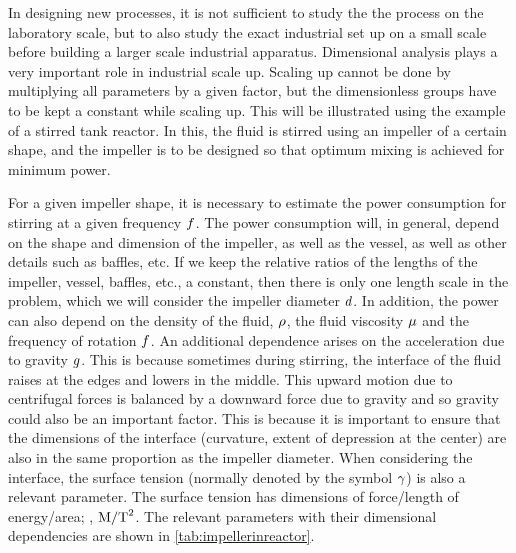 \begin{example}
In designing new processes, it is not sufficient to study the the process on the laboratory scale, but to also study the exact industrial set up on a small scale before building a larger scale industrial apparatus. Dimensional analysis plays a very important role in industrial scale up. Scaling up cannot be done by multiplying all parameters by a given factor, but the dimensionless groups have to be kept a constant while scaling up. This will be illustrated using the example of a stirred tank reactor. In this, the fluid is stirred using an impeller of a certain shape, and the impeller is to be designed so that optimum mixing is achieved for minimum power.
\end{example}

\begin{solution}
For a given impeller shape, it is necessary to estimate the power consumption for stirring at a given frequency $f$. The power consumption will, in general, depend on the shape and dimension of the impeller, as well as the vessel, as well as other details such as baffles, etc. If we keep the relative ratios of the lengths of the impeller, vessel, baffles, etc., a constant, then there is only one length scale in the problem, which we will consider the impeller diameter $d$. In addition, the power can also depend on the density of the fluid, $\rho$, the fluid viscosity $\mu$ and the frequency of rotation $f$. An additional dependence arises on the acceleration due to gravity $g$. This is because sometimes during stirring, the interface of the fluid raises at the edges and lowers in the middle. This upward motion due to centrifugal forces is balanced by a downward force due to gravity and so gravity could also be an important factor. This is because it is important to ensure that the dimensions of the interface (curvature, extent of depression at the center) are also in the same proportion as the impeller diameter. When considering the interface, the surface tension (normally denoted by the symbol $\gamma$) is also a relevant parameter. The surface tension has dimensions of force/length of energy/area; \ie, $\text{M}/\text{T}^2$. The relevant parameters with their dimensional dependencies are shown in \autoref{tab:impellerinreactor}.
%
%
\toprule

\end{solution}
